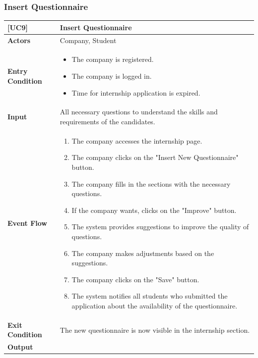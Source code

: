 \subsubsection*{Insert Questionnaire}
\begin{table}[H]
    \centering
    \renewcommand{\arraystretch}{1.5}
    \begin{tabular}{|p{4cm}|p{11cm}|}
    \hline
    \rowcolor{bluepoli!40}
    \textbf{[UC9]} & \textbf{Insert Questionnaire} \\ \hline \hline
    \textbf{Actors} & Company, Student \\ \hline
    \textbf{Entry Condition} & 
    \begin{itemize}
        \item The company is registered.
        \item The company is logged in.
        \item Time for internship application is expired.
    \end{itemize} \\ \hline
    \textbf{Input} & 
    All necessary questions to understand the skills and requirements of the candidates. \\ \hline
    \textbf{Event Flow} & 
    {\setlength{\leftmargini}{1.4em}
    \begin{enumerate}
        \item The company accesses the internship page.
        \item The company clicks on the "Insert New Questionnaire" button.
        \item The company fills in the sections with the necessary questions.
        \item If the company wants, clicks on the "Improve" button.
        \item The system provides suggestions to improve the quality of questions.
        \item The company makes adjustments based on the suggestions.
        \item The company clicks on the "Save" button.
        \item The system notifies all students who submitted the application about the availability of the questionnaire.
    \end{enumerate}} \\ \hline
    \textbf{Exit Condition} & 
    The new questionnaire is now visible in the internship section. \\ \hline
    \textbf{Output} & 
    {\setlength{\leftmargini}{1.1em}
}
\end{tabular}
\end{table}
